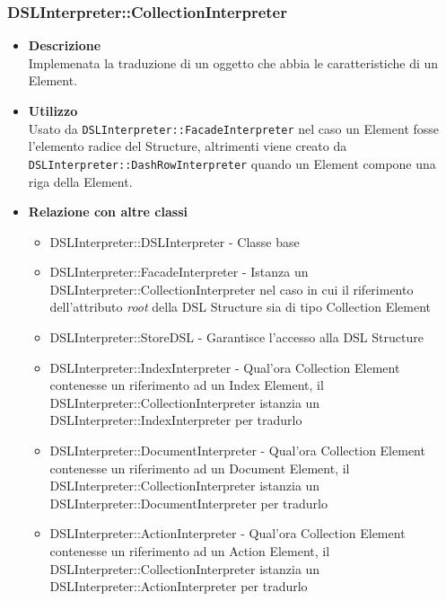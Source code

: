 \subsubsection{DSLInterpreter::CollectionInterpreter}
\begin{itemize}
\item \textbf{Descrizione} \hfill \\
Implemenata la traduzione di un oggetto che abbia le caratteristiche di un  Element.
\item \textbf{Utilizzo} \hfill \\
  Usato da \texttt{DSLInterpreter::FacadeInterpreter} \newline nel caso un  Element fosse l'elemento radice del  Structure, altrimenti viene creato da \texttt{DSLInterpreter::DashRowInterpreter} \newline quando un  Element compone una riga della  Element.
\item \textbf{Relazione con altre classi}
\begin{itemize}
\item DSLInterpreter::DSLInterpreter - Classe base
\item DSLInterpreter::FacadeInterpreter - Istanza un DSLInterpreter::CollectionInterpreter nel caso in cui il riferimento dell'attributo \textit{root} della DSL Structure sia di tipo Collection Element 
\item DSLInterpreter::StoreDSL - Garantisce l'accesso alla DSL Structure
\item DSLInterpreter::IndexInterpreter - Qual'ora Collection Element contenesse un riferimento ad un Index Element, il DSLInterpreter::CollectionInterpreter istanzia un DSLInterpreter::IndexInterpreter per tradurlo
\item DSLInterpreter::DocumentInterpreter - Qual'ora Collection Element contenesse un riferimento ad un Document Element, il DSLInterpreter::CollectionInterpreter istanzia un DSLInterpreter::DocumentInterpreter per tradurlo
\item DSLInterpreter::ActionInterpreter - Qual'ora Collection Element contenesse un riferimento ad un Action Element, il DSLInterpreter::CollectionInterpreter istanzia un DSLInterpreter::ActionInterpreter per tradurlo
\end{itemize}
\end{itemize}

